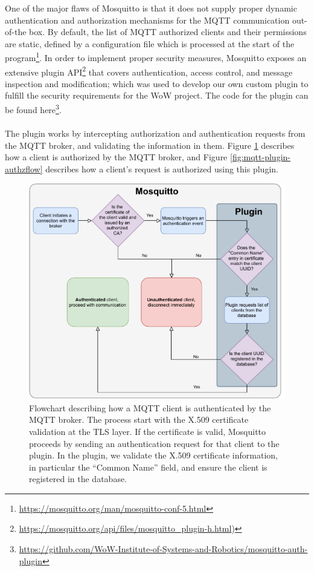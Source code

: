 One of the major flaws of Mosquitto is that it does not supply proper dynamic authentication and authorization mechanisms for the \acs{MQTT} communication out-of-the box. By default, the list of \acs{MQTT} authorized clients and their permissions are static, defined by a configuration file which is processed at the start of the program\footnote{\url{https://mosquitto.org/man/mosquitto-conf-5.html}}. In order to implement proper security measures, Mosquitto exposes an extensive plugin \acs{API}\footnote{\url{https://mosquitto.org/api/files/mosquitto\_plugin-h.html})} that covers authentication, access control, and message inspection and modification; which was used to develop our own custom plugin to fulfill the security requirements for the \acs{WoW} project. The code for the plugin can be found here\footnote{\url{https://github.com/WoW-Institute-of-Systems-and-Robotics/mosquitto-auth-plugin}}.

\paragraph{} The plugin works by intercepting authorization and authentication requests from the \acs{MQTT} broker, and validating the information in them. Figure \ref{fig:mqtt-plugin-authnflow} describes how a client is authorized by the \acs{MQTT} broker, and Figure \ref{fig:mqtt-plugin-authzflow} describes how a client's request is authorized using this plugin.

\begin{figure}[H]
    \centering
    \includegraphics[width=\linewidth]{images/mqtt authentication.pdf}
    \caption[Flowchart describing how a \acs{MQTT} client is authenticated by the \acs{MQTT} broker.]{Flowchart describing how a \acs{MQTT} client is authenticated by the \acs{MQTT} broker. The process start with the X.509 certificate validation at the \acs{TLS} layer. If the certificate is valid, Mosquitto proceeds by sending an authentication request for that client to the plugin. In the plugin, we validate the X.509 certificate information, in particular the ``Common Name'' field, and ensure the client is registered in the database.}
    \label{fig:mqtt-plugin-authnflow}
\end{figure}

